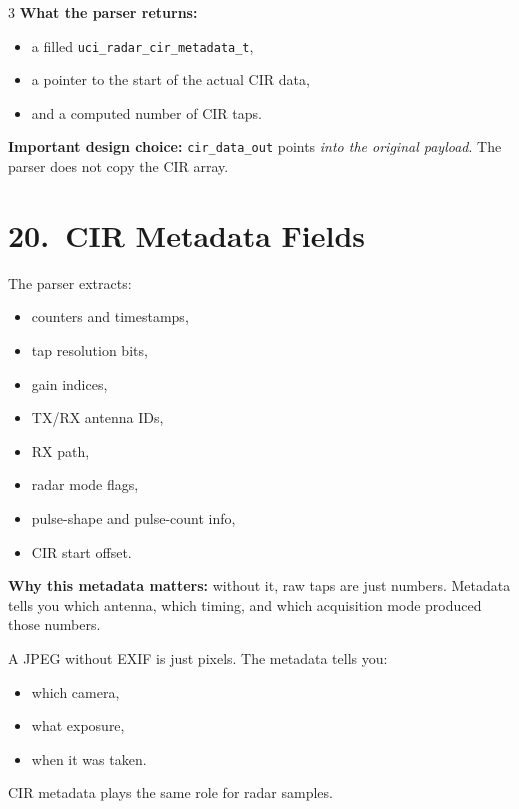 \documentclass[10pt]{article}
\begin{document}
\begin{multicols*}{3}
\textbf{What the parser returns:}
\begin{itemize}
  \item a filled \texttt{uci\_radar\_cir\_metadata\_t},
  \item a pointer to the start of the actual CIR data,
  \item and a computed number of CIR taps.
\end{itemize}

\textbf{Important design choice:}
\texttt{cir\_data\_out} points \emph{into the original payload}. The parser does not copy the CIR array.

\section*{20.\ CIR Metadata Fields}

The parser extracts:
\begin{itemize}
  \item counters and timestamps,
  \item tap resolution bits,
  \item gain indices,
  \item TX/RX antenna IDs,
  \item RX path,
  \item radar mode flags,
  \item pulse-shape and pulse-count info,
  \item CIR start offset.
\end{itemize}

\textbf{Why this metadata matters:}
without it, raw taps are just numbers. Metadata tells you which antenna, which timing, and which acquisition mode produced those numbers.

\begin{tcolorbox}[analogybox={Analogy --- A Photo Needs EXIF Metadata}]
A JPEG without EXIF is just pixels.
The metadata tells you:
\begin{itemize}
  \item which camera,
  \item what exposure,
  \item when it was taken.
\end{itemize}
CIR metadata plays the same role for radar samples.
\end{tcolorbox}


\end{multicols*}
\end{document}
